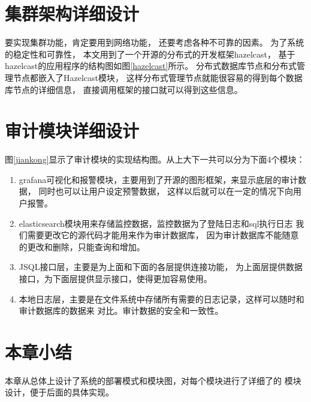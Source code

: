 \section{集群架构详细设计}
要实现集群功能，肯定要用到网络功能，
还要考虑各种不可靠的因素。
为了系统的稳定性和可靠性，
本文用到了一个开源的分布式的开发框架hazelcast，
基于hazelcast的应用程序的结构图如图\ref{hazelcast}所示。
分布式数据库节点和分布式管理节点都嵌入了Hazelcast模块，
这样分布式管理节点就能很容易的得到每个数据库节点的详细信息，
直接调用框架的接口就可以得到这些信息。
\section{审计模块详细设计}
图\ref{jiankong}显示了审计模块的实现结构图。从上大下一共可以分为下面4个模块：
\begin{enumerate}
	\item grafana可视化和报警模块，主要用到了开源的图形框架，来显示底层的审计数据，
	同时也可以让用户设定预警数据，
	这样以后就可以在一定的情况下向用户报警。
	\item elasticsearch模块用来存储监控数据，监控数据为了登陆日志和sql执行日志
	我们需要更改它的源代码才能用来作为审计数据库，
	因为审计数据库不能随意的更改和删除，只能查询和增加。
	\item JSQL接口层，主要是为上面和下面的各层提供连接功能，
	为上面层提供数据接口，为下面层提供显示接口，使得更加容易使用。
	\item 本地日志层，主要是在文件系统中存储所有需要的日志记录，这样可以随时和审计数据库的数据来
	对比。审计数据的安全和一致性。
\end{enumerate}
\section{本章小结}
本章从总体上设计了系统的部署模式和模块图，对每个模块进行了详细了的
模块设计，便于后面的具体实现。